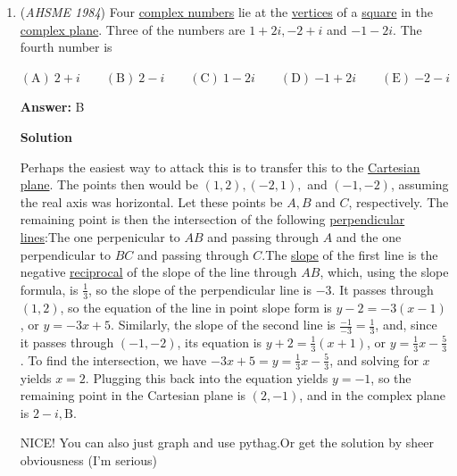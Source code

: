 \begin{enumerate}
 


	\item (\textit{AHSME 1984}) Four \href{https://artofproblemsolving.com/wiki/index.php?title=Complex\_numbers}{complex numbers} lie at the \href{https://artofproblemsolving.com/wiki/index.php?title=Vertices}{vertices} of a \href{https://artofproblemsolving.com/wiki/index.php?title=Square}{square} in the \href{https://artofproblemsolving.com/wiki/index.php?title=Complex\_plane}{complex plane}. Three of the numbers are $1+2i, {-2}+i$ and ${-1}-2i$. The fourth number is 


 $\mathrm{(A) \ }2+i \qquad \mathrm{(B) \ }2-i \qquad \mathrm{(C) \ } 1-2i \qquad \mathrm{(D) \ }{-1}+2i \qquad \mathrm{(E) \ } {-2}-i$

 \textbf{Answer: }B



\textbf{Solution}

Perhaps the easiest way to attack this is to transfer this to the \href{https://artofproblemsolving.com/wiki/index.php?title=Cartesian\_plane}{Cartesian plane}. The points then would be $(1, 2), (-2, 1),$ and $(-1, -2)$, assuming the real axis was horizontal. Let these points be $A, B$ and $C$, respectively. The remaining point is then the intersection of the following \href{https://artofproblemsolving.com/wiki/index.php?title=Perpendicular}{perpendicular} \href{https://artofproblemsolving.com/wiki/index.php?title=Line}{lines}:The one perpenicular to $AB$ and passing through $A$ and the one perpendicular to $BC$ and passing through $C$.The \href{https://artofproblemsolving.com/wiki/index.php?title=Slope}{slope} of the first line is the negative \href{https://artofproblemsolving.com/wiki/index.php?title=Reciprocal}{reciprocal} of the slope of the line through $AB$, which, using the slope formula, is $\frac{1}{3}$, so the slope of the perpendicular line is $-3$. It passes through $(1,2)$, so the equation of the line in point slope form is $y-2=-3(x-1)$, or $y=-3x+5$. Similarly, the slope of the second line is $\frac{-1}{-3}=\frac{1}{3}$, and, since it passes through $(-1,-2)$, its equation is $y+2=\frac{1}{3}(x+1)$, or $y=\frac{1}{3}x-\frac{5}{3}$. To find the intersection, we have $-3x+5=y=\frac{1}{3}x-\frac{5}{3}$, and solving for $x$ yields $x=2$. Plugging this back into the equation yields $y=-1$, so the remaining point in the Cartesian plane is $(2, -1)$, and in the complex plane is $2-i, \boxed{\text{B}}$.

 


 NICE! You can also just graph and use pythag.Or get the solution by sheer obviousness (I'm serious)


\end{enumerate}
